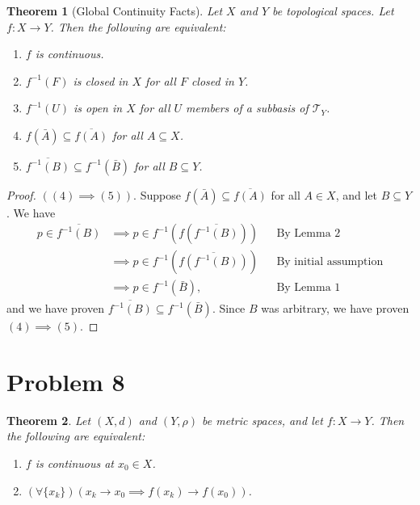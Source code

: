 \documentclass[10pt,a4paper]{article}
\theoremstyle{theorem}
\newtheorem{theorem}{Theorem}
\theoremstyle{definition}
\newcommand{\Tau}{\mathcal{T}}
\begin{document}
\begin{theorem}[Global Continuity Facts]
Let $X$ and $Y$ be topological spaces. Let $f:X \to Y$. Then the following are equivalent:
\begin{enumerate}
\item $f$ is continuous.
\item $f^{-1}(F)$ is closed in $X$ for all $F$ closed in $Y$.
\item $f^{-1}(U)$ is open in $X$ for all $U$ members of a subbasis of $\Tau_Y$.
\item $f(\bar{A}) \subseteq \overline{f(A)}$ for all $A \subseteq X$.
\item $\overline{f^{-1}(B)} \subseteq f^{-1}(\bar{B})$ for all $B \subseteq Y$.
\end{enumerate}
\end{theorem}

\begin{proof}$((4) \implies (5))$.  Suppose $f(\bar{A}) \subseteq \overline{f(A)}$ for all $A \in X$, and let $B \subseteq Y$. We have
\begin{align*}
p \in \overline{f^{-1}(B)} &\implies p \in f^{-1}(f(\overline{f^{-1}(B)})) && \text{By Lemma 2}\\
&\implies p \in f^{-1}(\overline{f(f^{-1}(B))}) && \text{By initial assumption}\\
&\implies p \in f^{-1}(\bar{B}), &&\text{By Lemma 1}
\end{align*}
and we have proven $\overline{f^{-1}(B)} \subseteq f^{-1}(\bar{B})$. Since $B$ was arbitrary, we have proven $(4) \implies (5)$.
\end{proof}

\section*{Problem 8}
\begin{theorem}
Let $(X, d)$ and $(Y, \rho)$ be metric spaces, and let $f : X \to Y$. Then the following are equivalent:
\begin{enumerate}
\item $f$ is continuous at $x_0 \in X$.
\item $(\forall \{x_k\})(x_k \to x_0 \implies f(x_k) \to f(x_0))$.
\end{enumerate}
\end{theorem}
\end{document}

